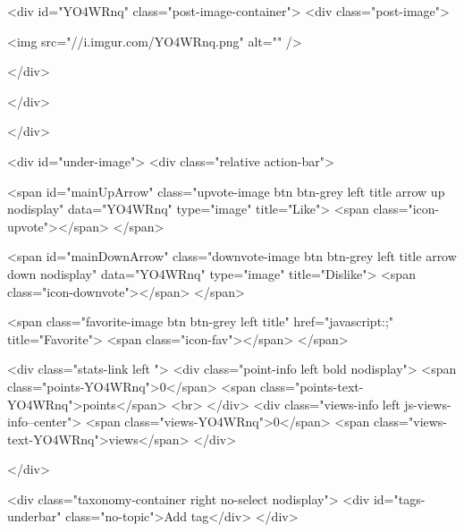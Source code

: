                     

                    <div id="YO4WRnq" class="post-image-container">
                        <div class="post-image">
    

                        <img src="//i.imgur.com/YO4WRnq.png" alt="" />
        
    
</div>


                        
                    </div>
                

                

                
                </div>

                <div id="under-image">
                    <div class="relative action-bar">

    <span id="mainUpArrow" class="upvote-image btn btn-grey left title arrow up nodisplay" data="YO4WRnq" type="image" title="Like">
        <span class="icon-upvote"></span>
    </span>

    <span id="mainDownArrow" class="downvote-image btn btn-grey left title arrow down nodisplay" data="YO4WRnq" type="image" title="Dislike">
        <span class="icon-downvote"></span>
    </span>

    <span class="favorite-image btn btn-grey left title" href="javascript:;" title="Favorite">
        <span class="icon-fav"></span>
    </span>

    <div class="stats-link left ">
                    <div class="point-info left bold nodisplay">
                <span class="points-YO4WRnq">0</span>
                <span class="points-text-YO4WRnq">points</span>
                <br>
            </div>
            <div class="views-info left js-views-info--center">
                <span class="views-YO4WRnq">0</span>
                <span class="views-text-YO4WRnq">views</span>
            </div>
        

        
                    
        

    </div>

    <div class="taxonomy-container right no-select nodisplay">
        <div id="tags-underbar" class="no-topic">Add tag</div>
    </div>

